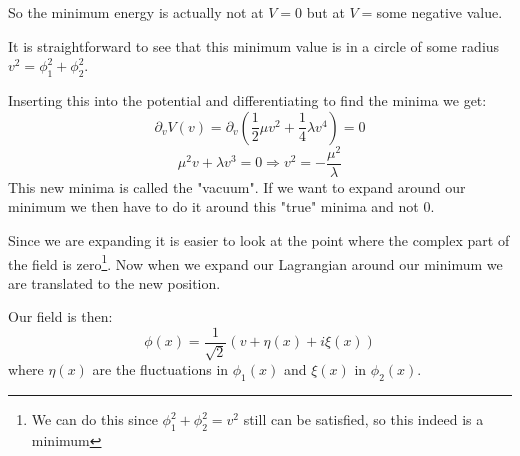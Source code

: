 \documentclass[a4,10pt,titlepage]{article}
\renewcommand\[{\begin{equation*}}
\renewcommand\]{\end{equation*}}
\numberwithin{equation}{section}
\newcommand{\lp}{\left}
\newcommand{\rp}{\right}
\newcommand{\half}{\frac{1}{2}}
\begin{document}
So the minimum energy is actually not at $V=0$ but at $V=$some negative value.

It is straightforward to see that this minimum value is in a circle of some radius $v^2=\phi_1^2+\phi_2^2$.

Inserting this into the potential and differentiating to find the minima we get:
\[
\partial_v V(v)=\partial_v \lp(\half \mu v^2+\frac{1}{4}\lambda v^4\rp)=0
\]
\[
\mu^2 v+\lambda v^3=0\Rightarrow v^2=-\frac{\mu^2}{\lambda}
\]
This new minima is called the "vacuum". If we want to expand around our minimum we then have to do it around this "true" minima and not 0.

Since we are expanding it is easier to look at the point where the complex part of the field is zero\footnote{We can do this since $\phi_1^2+\phi_2^2=v^2$ still can be satisfied, so this indeed is a minimum}. Now when we expand our Lagrangian around our minimum we are translated to the new position. 

Our field is then:
\[
\phi(x)=\frac{1}{\sqrt{2}}\lp(v+\eta(x)+i\xi(x) \rp)
\]
where $\eta(x)$ are the fluctuations in $\phi_1(x)$ and $\xi(x)$ in $\phi_2(x)$.
\end{document}
